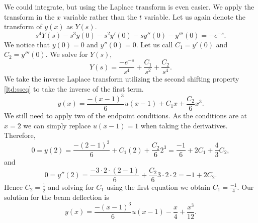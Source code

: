 \documentclass{ximera}
\begin{document}
\begin{exampleSol}
    We could integrate, but using the Laplace transform is even easier. We apply the transform in the $x$ variable rather than the $t$ variable.  Let us again denote the transform of $y(x)$ as $Y(s)$.
    \begin{equation*}
        s^4Y(s)-s^3y(0)-s^2y'(0)-sy''(0)-y'''(0) = -e^{-s}.
    \end{equation*}
    We notice that $y(0) = 0$ and $y''(0) = 0$.  Let us call $C_1 = y'(0)$ and $C_2=y'''(0)$. We solve for $Y(s)$,
    \begin{equation*}
        Y(s) = \frac{-e^{-s}}{s^4} + \frac{C_1}{s^2}+ \frac{C_2}{s^4} .
    \end{equation*}
    We take the inverse Laplace transform utilizing the second shifting property \eqref{ltd:sseq} to take the inverse of the first term.
    \begin{equation*}
        y(x) = \frac{-{(x-1)}^3}{6} u(x-1) + C_1 x + \frac{C_2}{6} x^3 .
    \end{equation*}
    We still need to apply two of the endpoint conditions.  As the conditions are at $x=2$ we can simply replace $u(x-1) = 1$ when taking the derivatives.  Therefore,
    \begin{equation*}
        0 = y(2) = \frac{-{(2-1)}^3}{6} + C_1 (2) + \frac{C_2}{6} 2^3 = \frac{-1}{6} + 2 C_1 + \frac{4}{3} C_2 ,
    \end{equation*}
    and
    \begin{equation*}
        0 = y''(2) = \frac{-3\cdot 2 \cdot (2-1)}{6} + \frac{C_2}{6} 3\cdot 2 \cdot 2  = -1 + 2 C_2 .
    \end{equation*}
    Hence $C_2 = \frac{1}{2}$ and solving for $C_1$ using the first equation we obtain $C_1 = \frac{-1}{4}$.  Our solution for the beam deflection is
    \begin{equation*}
        y(x) = \frac{-{(x-1)}^3}{6} u(x-1) - \frac{x}{4} + \frac{x^3}{12} .
    \end{equation*}
\end{exampleSol}
\end{document}

